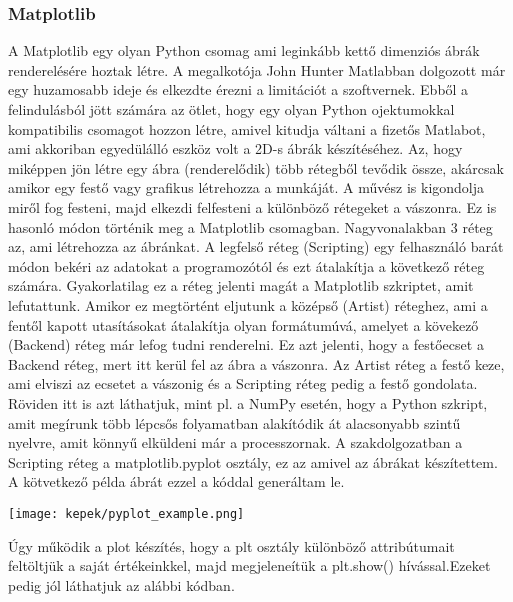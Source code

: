 \documentclass{article}
\theoremstyle{definition}
\theoremstyle{theorem}
\begin{document}
\subsubsection{Matplotlib}
A Matplotlib egy olyan Python csomag ami leginkább kettő dimenziós ábrák renderelésére hoztak létre. A megalkotója John Hunter Matlabban dolgozott már egy huzamosabb ideje és elkezdte érezni a limitációt a szoftvernek. Ebből a felindulásból jött számára az ötlet, hogy egy olyan Python ojektumokkal kompatibilis csomagot hozzon létre, amivel kitudja váltani a fizetős Matlabot, ami akkoriban egyedülálló eszköz volt a 2D-s ábrák készítéséhez. Az, hogy miképpen jön létre egy ábra (renderelődik) több rétegből tevődik össze, akárcsak amikor egy festő vagy grafikus létrehozza a munkáját. A művész is kigondolja miről fog festeni, majd elkezdi felfesteni a különböző rétegeket a vászonra. Ez is hasonló módon történik meg a Matplotlib csomagban. Nagyvonalakban 3 réteg az, ami létrehozza az ábránkat. A legfelső réteg (Scripting) egy felhasználó barát módon bekéri az adatokat a programozótól és ezt átalakítja a következő réteg számára. Gyakorlatilag ez a réteg jelenti magát a Matplotlib szkriptet, amit lefutattunk. Amikor ez megtörtént eljutunk a középső (Artist) réteghez, ami a fentől kapott utasításokat átalakítja olyan formátumúvá, amelyet a kövekező (Backend) réteg már lefog tudni renderelni. Ez azt jelenti, hogy a festőecset a Backend réteg, mert itt kerül fel az ábra a vászonra. Az Artist réteg a festő keze, ami elviszi az ecsetet a vászonig és a Scripting réteg pedig a festő gondolata. Röviden itt is azt láthatjuk, mint pl. a NumPy esetén, hogy a Python szkript, amit megírunk több lépcsős folyamatban alakítódik át alacsonyabb szintű nyelvre, amit könnyű elküldeni már a processzornak.\newline
A szakdolgozatban a Scripting réteg a matplotlib.pyplot osztály, ez az amivel az ábrákat készítettem.
A kötvetkező példa ábrát ezzel a kóddal generáltam le.
\begin{center}
\texttt{[image: kepek/pyplot\_example.png]}
\end{center}
Úgy működik a plot készítés, hogy a plt osztály különböző attribútumait feltöltjük a saját értékeinkkel, majd megjeleneítük a plt.show() hívással.Ezeket pedig jól láthatjuk az alábbi kódban.

\end{document}
